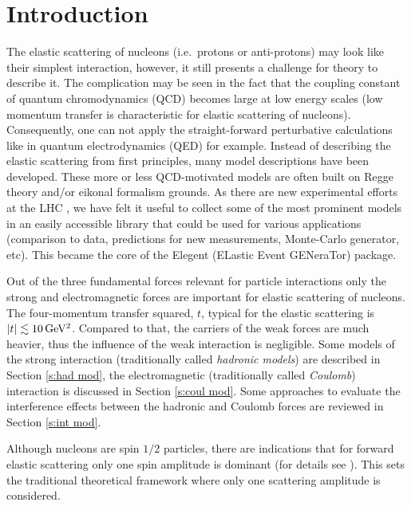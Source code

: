 \documentclass[preprint,12pt]{elsarticle}
\def\un#1{{\,\rm #1}}
\begin{document}
\newpage



\section{Introduction}\label{s:inc}

The elastic scattering of nucleons (i.e.~protons or anti-protons) may look like their simplest interaction, however, it still presents a challenge for theory to describe it. The complication may be seen in the fact that the coupling constant of quantum chromodynamics (QCD) becomes large at low energy scales (low momentum transfer is characteristic for elastic scattering of nucleons). Consequently, one can not apply the straight-forward perturbative calculations like in quantum electrodynamics (QED) for example. Instead of describing the elastic scattering from first principles, many model descriptions have been developed. These more or less QCD-motivated models are often built on Regge theory and/or eikonal formalism grounds. As there are new experimental efforts at the LHC \cite{totem,alfa}, we have felt it useful to collect some of the most prominent models in an easily accessible library that could be used for various applications (comparison to data, predictions for new measurements, Monte-Carlo generator, etc). This became the core of the Elegent (ELastic Event GENeraTor) package.

Out of the three fundamental forces relevant for particle interactions only the strong and electromagnetic forces are important for elastic scattering of nucleons. The four-momentum transfer squared, $t$, typical for the elastic scattering is $|t| \lesssim 10\un{GeV^2}$. Compared to that, the carriers of the weak forces are much heavier, thus the influence of the weak interaction is negligible. Some models of the strong interaction (traditionally called {\em hadronic models}) are described in Section \ref{s:had mod}, the electromagnetic (traditionally called {\em Coulomb}) interaction is discussed in Section \ref{s:coul mod}. Some approaches to evaluate the interference effects between the hadronic and Coulomb forces are reviewed in Section \ref{s:int mod}.

Although nucleons are spin $1/2$ particles, there are indications that for forward elastic scattering only one spin amplitude is dominant (for details see \cite[section 1]{jan_thesis}). This sets the traditional theoretical framework where only one scattering amplitude is considered.
\end{document}
